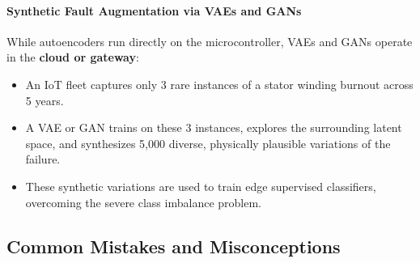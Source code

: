 \paragraph{Synthetic Fault Augmentation via VAEs and GANs}
While autoencoders run directly on the microcontroller, VAEs and GANs operate in the \textbf{cloud or gateway}:
\begin{itemize}
    \item An IoT fleet captures only 3 rare instances of a stator winding burnout across 5 years.
    \item A VAE or GAN trains on these 3 instances, explores the surrounding latent space, and synthesizes 5,000 diverse, physically plausible variations of the failure.
    \item These synthetic variations are used to train edge supervised classifiers, overcoming the severe class imbalance problem.
\end{itemize}

\subsection{Common Mistakes and Misconceptions}\label{subsec:mistakes}

